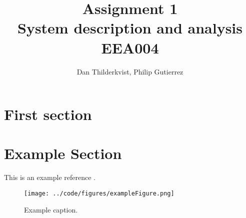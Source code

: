 \documentclass[a4paper, titlepage]{article}
\title{Assignment 1\\
System description and analysis\\
\large EEA004}
\author{Dan Thilderkvist, Philip Gutierrez}
\begin{document}
\maketitle

\section{First section}

\clearpage


\clearpage
\appendix

\section{Example Section}
This is an example reference \citep{glad00}.

\begin{figure}[h!]
\center
\texttt{[image: ../code/figures/exampleFigure.png]}
\caption{Example caption.}
\label{fig:exampleLable}
\end{figure}


\end{document}
